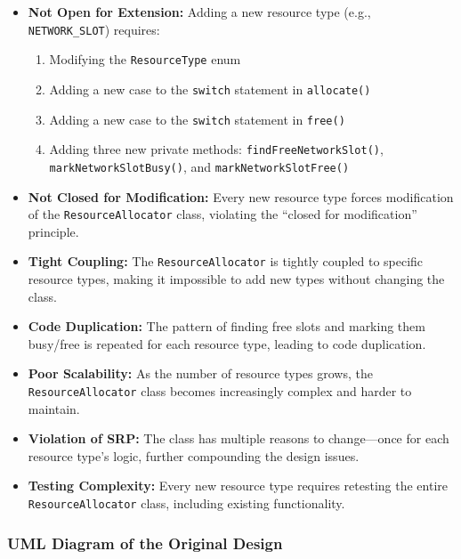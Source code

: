 \begin{itemize}
    \item \textbf{Not Open for Extension:} Adding a new resource type (e.g., \texttt{NETWORK\_SLOT}) requires:
    \begin{enumerate}
        \item Modifying the \texttt{ResourceType} enum
        \item Adding a new case to the \texttt{switch} statement in \texttt{allocate()}
        \item Adding a new case to the \texttt{switch} statement in \texttt{free()}
        \item Adding three new private methods: \texttt{findFreeNetworkSlot()}, \texttt{markNetworkSlotBusy()}, and \texttt{markNetworkSlotFree()}
    \end{enumerate}
    
    \item \textbf{Not Closed for Modification:} Every new resource type forces modification of the \texttt{ResourceAllocator} class, violating the ``closed for modification'' principle.
    
    \item \textbf{Tight Coupling:} The \texttt{ResourceAllocator} is tightly coupled to specific resource types, making it impossible to add new types without changing the class.
    
    \item \textbf{Code Duplication:} The pattern of finding free slots and marking them busy/free is repeated for each resource type, leading to code duplication.
    
    \item \textbf{Poor Scalability:} As the number of resource types grows, the \texttt{ResourceAllocator} class becomes increasingly complex and harder to maintain.
    
    \item \textbf{Violation of SRP:} The class has multiple reasons to change—once for each resource type's logic, further compounding the design issues.
    
    \item \textbf{Testing Complexity:} Every new resource type requires retesting the entire \texttt{ResourceAllocator} class, including existing functionality.
\end{itemize}

\subsubsection{UML Diagram of the Original Design}

